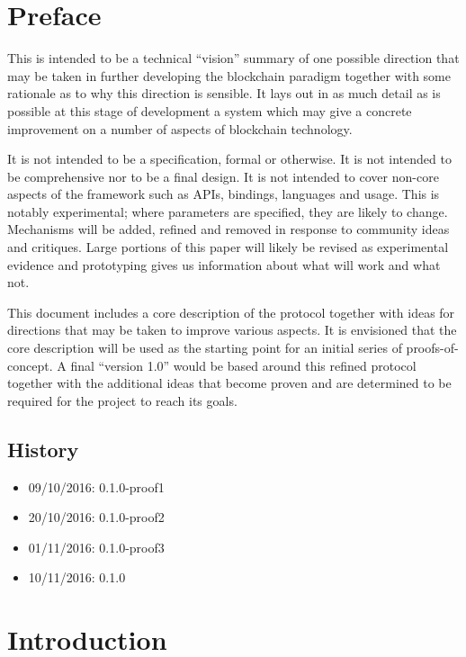 \documentclass[9pt,oneside]{amsart}
\begin{document}
\setlength{\columnsep}{20pt}
\begin{multicols}{2}

\section{Preface}\label{preface}

 This is intended to be a technical ``vision'' summary of one possible direction that may be taken in further developing the blockchain paradigm together with some rationale as to why this direction is sensible. It lays out in as much detail as is possible at this stage of development a system which may give a concrete improvement on a number of aspects of blockchain technology.

 It is not intended to be a specification, formal or otherwise. It is not intended to be comprehensive nor to be a final design. It is not intended to cover non-core aspects of the framework such as APIs, bindings, languages and usage. This is notably experimental; where parameters are specified, they are likely to change. Mechanisms will be added, refined and removed in response to community ideas and critiques. Large portions of this paper will likely be revised as experimental evidence and prototyping gives us information about what will work and what not.

 This document includes a core description of the protocol together with ideas for directions that may be taken to improve various aspects. It is envisioned that the core description will be used as the starting point for an initial series of proofs-of-concept. A final ``version 1.0'' would be based around this refined protocol together with the additional ideas that become proven and are determined to be required for the project to reach its goals.

\subsection{History}\label{history}

\begin{itemize}
\item 09/10/2016: 0.1.0-proof1
\item 20/10/2016: 0.1.0-proof2
\item 01/11/2016: 0.1.0-proof3
\item 10/11/2016: 0.1.0
\end{itemize}

\section{Introduction}\label{introduction}


\end{multicols}
\end{document}
